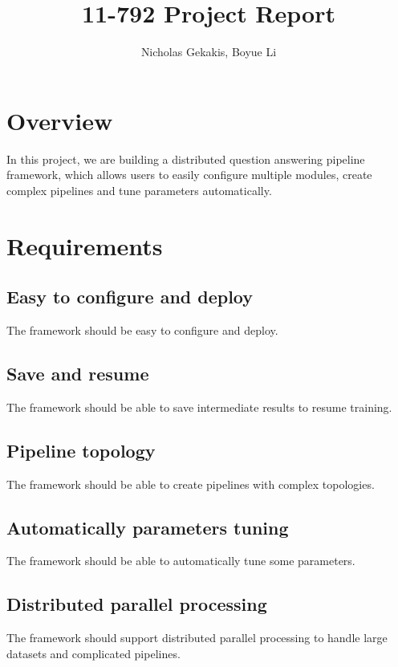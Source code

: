 \documentclass{article}
\begin{document}
\title{11-792 Project Report}
 
\author{Nicholas Gekakis, Boyue Li}
 
\maketitle
 
\section{Overview}

In this project, we are building a distributed question answering pipeline framework,
which allows users to easily configure multiple modules,
create complex pipelines and tune parameters automatically.

\section{Requirements}

    \subsection{Easy to configure and deploy}
    The framework should be easy to configure and deploy.

    \subsection{Save and resume}
    The framework should be able to save intermediate results to resume training.

    \subsection{Pipeline topology}
    The framework should be able to create pipelines with complex topologies.

    \subsection{Automatically parameters tuning}
    The framework should be able to automatically tune some parameters.

    \subsection{Distributed parallel processing}
    The framework should support distributed parallel processing to handle large datasets and complicated pipelines.
\end{document}
